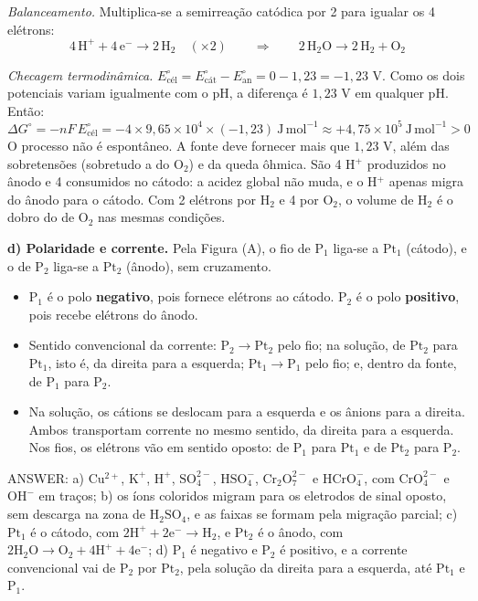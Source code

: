 \documentclass{article}%
\begin{document}
\textit{Balanceamento.} Multiplica-se a semirreação catódica por 2 para igualar os 4 elétrons:
\[
\mathrm{4\,H^+ + 4\,e^- \rightarrow 2\,H_2}\quad(\times 2)\qquad\Rightarrow\qquad \mathrm{2\,H_2O \rightarrow 2\,H_2 + O_2}
\]

\textit{Checagem termodinâmica.} $E^\circ_{\mathrm{cél}}=E^\circ_{\mathrm{cát}}-E^\circ_{\mathrm{an}}=0-1{,}23=-1{,}23$ V. Como os dois potenciais variam igualmente com o pH, a diferença é $1{,}23$ V em qualquer pH. Então:
\[
\Delta G^\circ=-nF\,E^\circ_{\mathrm{cél}}=-4\times 9{,}65\times10^{4}\times(-1{,}23)\ \mathrm{J\,mol^{-1}}\approx +4{,}75\times10^{5}\ \mathrm{J\,mol^{-1}}>0
\]
O processo não é espontâneo. A fonte deve fornecer mais que $1{,}23$ V, além das sobretensões (sobretudo a do $\mathrm{O_2}$) e da queda ôhmica. São 4 H$^+$ produzidos no ânodo e 4 consumidos no cátodo: a acidez global não muda, e o H$^+$ apenas migra do ânodo para o cátodo. Com 2 elétrons por H$_2$ e 4 por O$_2$, o volume de H$_2$ é o dobro do de O$_2$ nas mesmas condições.

\textbf{d) Polaridade e corrente.} Pela Figura (A), o fio de $\mathrm{P_1}$ liga-se a $\mathrm{Pt_1}$ (cátodo), e o de $\mathrm{P_2}$ liga-se a $\mathrm{Pt_2}$ (ânodo), sem cruzamento.
\begin{itemize}
\item $\mathrm{P_1}$ é o polo \textbf{negativo}, pois fornece elétrons ao cátodo. $\mathrm{P_2}$ é o polo \textbf{positivo}, pois recebe elétrons do ânodo.
\item Sentido convencional da corrente: $\mathrm{P_2 \rightarrow Pt_2}$ pelo fio; na solução, de $\mathrm{Pt_2}$ para $\mathrm{Pt_1}$, isto é, da direita para a esquerda; $\mathrm{Pt_1 \rightarrow P_1}$ pelo fio; e, dentro da fonte, de $\mathrm{P_1}$ para $\mathrm{P_2}$.
\item Na solução, os cátions se deslocam para a esquerda e os ânions para a direita. Ambos transportam corrente no mesmo sentido, da direita para a esquerda. Nos fios, os elétrons vão em sentido oposto: de $\mathrm{P_1}$ para $\mathrm{Pt_1}$ e de $\mathrm{Pt_2}$ para $\mathrm{P_2}$.
\end{itemize}

ANSWER: a) $\mathrm{Cu^{2+}}$, $\mathrm{K^+}$, $\mathrm{H^+}$, $\mathrm{SO_4^{2-}}$, $\mathrm{HSO_4^-}$, $\mathrm{Cr_2O_7^{2-}}$ e $\mathrm{HCrO_4^-}$, com $\mathrm{CrO_4^{2-}}$ e $\mathrm{OH^-}$ em traços; b) os íons coloridos migram para os eletrodos de sinal oposto, sem descarga na zona de $\mathrm{H_2SO_4}$, e as faixas se formam pela migração parcial; c) $\mathrm{Pt_1}$ é o cátodo, com $\mathrm{2H^+ + 2e^- \rightarrow H_2}$, e $\mathrm{Pt_2}$ é o ânodo, com $\mathrm{2H_2O \rightarrow O_2 + 4H^+ + 4e^-}$; d) $\mathrm{P_1}$ é negativo e $\mathrm{P_2}$ é positivo, e a corrente convencional vai de $\mathrm{P_2}$ por $\mathrm{Pt_2}$, pela solução da direita para a esquerda, até $\mathrm{Pt_1}$ e $\mathrm{P_1}$.%
\newpage%
\end{document}
